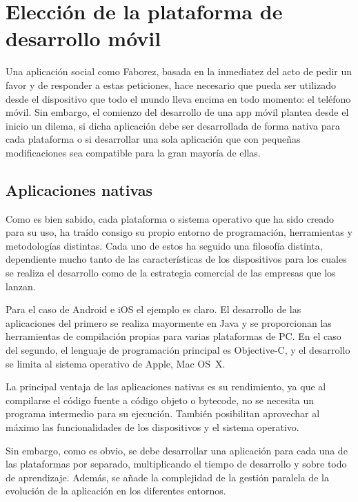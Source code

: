 \documentclass[main]{subfiles}
\begin{document}
\section{Elección de la plataforma de desarrollo móvil}
\label{sec:tech-android}

Una aplicación social como Faborez, basada en la inmediatez del acto de pedir un favor y de responder a estas peticiones, hace necesario que pueda ser utilizado desde el dispositivo que todo el mundo lleva encima en todo momento: el teléfono móvil. Sin embargo, el comienzo del desarrollo de una \gls{app} móvil plantea desde el inicio un dilema, si dicha aplicación debe ser desarrollada de forma nativa para cada plataforma o si desarrollar una sola aplicación que con pequeñas modificaciones sea compatible para la gran mayoría de ellas.

\subsection{Aplicaciones nativas}

Como es bien sabido, cada plataforma o sistema operativo que ha sido creado para su uso, ha traído consigo su propio entorno de programación, herramientas y metodologías distintas. Cada uno de estos ha seguido una filosofía distinta, dependiente mucho tanto de las características de los dispositivos para los cuales se realiza el desarrollo como de la estrategia comercial de las empresas que los lanzan.

Para el caso de Android e iOS el ejemplo es claro. El desarrollo de las aplicaciones del primero se realiza mayormente en Java y se proporcionan las herramientas de compilación propias para varias plataformas de PC. En el caso del segundo, el lenguaje de programación principal es Objective-C, y el desarrollo se limita al sistema operativo de Apple, Mac OS~X.

La principal ventaja de las aplicaciones nativas es su rendimiento, ya que al compilarse el código fuente a código objeto o \gls{bytecode}, no se necesita un programa intermedio para su ejecución. También posibilitan aprovechar al máximo las funcionalidades de los dispositivos y el sistema operativo.

Sin embargo, como es obvio, se debe desarrollar una aplicación para cada una de las plataformas por separado, multiplicando el tiempo de desarrollo y sobre todo de aprendizaje. Además, se añade la complejidad de la gestión paralela de la evolución de la aplicación en los diferentes entornos.
\end{document}
